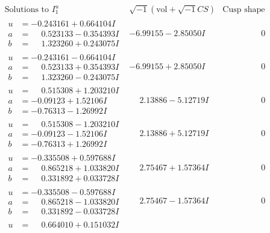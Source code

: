 \documentclass[1p]{elsarticle_modified}
\theoremstyle{definition}
\newcommand{\I}{\sqrt{-1}}
\begin{document}
$$\begin{array}{c|c|c}
\text{Solutions to }I^u_{1}& \I (\text{vol} + \sqrt{-1}CS) & \text{Cusp shape}\\
 \hline 
\begin{aligned}
u &= -0.243161 + 0.664104 I \\
a &= \phantom{-}0.523133 - 0.354393 I \\
b &= \phantom{-}1.323260 + 0.243075 I\end{aligned}
 & -6.99155 - 2.85050 I & \phantom{-0.000000 } 0 \\ \hline\begin{aligned}
u &= -0.243161 - 0.664104 I \\
a &= \phantom{-}0.523133 + 0.354393 I \\
b &= \phantom{-}1.323260 - 0.243075 I\end{aligned}
 & -6.99155 + 2.85050 I & \phantom{-0.000000 } 0 \\ \hline\begin{aligned}
u &= \phantom{-}0.515308 + 1.203210 I \\
a &= -0.09123 + 1.52106 I \\
b &= -0.76313 - 1.26992 I\end{aligned}
 & \phantom{-}2.13886 - 5.12719 I & \phantom{-0.000000 } 0 \\ \hline\begin{aligned}
u &= \phantom{-}0.515308 - 1.203210 I \\
a &= -0.09123 - 1.52106 I \\
b &= -0.76313 + 1.26992 I\end{aligned}
 & \phantom{-}2.13886 + 5.12719 I & \phantom{-0.000000 } 0 \\ \hline\begin{aligned}
u &= -0.335508 + 0.597688 I \\
a &= \phantom{-}0.865218 + 1.033820 I \\
b &= \phantom{-}0.331892 + 0.033728 I\end{aligned}
 & \phantom{-}2.75467 + 1.57364 I & \phantom{-0.000000 } 0 \\ \hline\begin{aligned}
u &= -0.335508 - 0.597688 I \\
a &= \phantom{-}0.865218 - 1.033820 I \\
b &= \phantom{-}0.331892 - 0.033728 I\end{aligned}
 & \phantom{-}2.75467 - 1.57364 I & \phantom{-0.000000 } 0 \\ \hline\begin{aligned}
u &= \phantom{-}0.664010 + 0.151032 I \\

\end{aligned}
\end{array}$$
\end{document}
